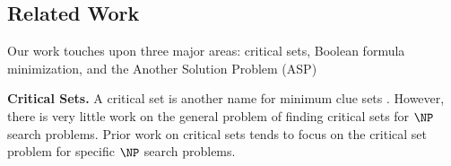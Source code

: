 \documentclass[runningheads,a4paper]{llncs}
\begin{document}
%
%
%
%

\subsection{Related Work}
\label{sec:relatedwork}

Our work touches upon three major areas: critical sets, Boolean formula minimization, and the Another Solution Problem (ASP) \

\noindent\textbf{Critical Sets.} A critical set is another name for minimum clue sets \cite{Cooper:2014:CSS:2612293.2612628}. However, there is very little work on the general problem of finding critical sets for $\NP$ search problems. Prior work on critical sets tends to focus on the critical set problem for specific $\NP$ search problems.
\end{document}
